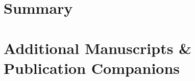 \chapter{Summary}\label{ch:summary}


\backmatter
\printbibliography[label=chap:references, title=References]
\let\printbibliography\relax

\appendix

\chapter{Additional Manuscripts \& Publication Companions}\label{additional-manuscripts}\clearpage

